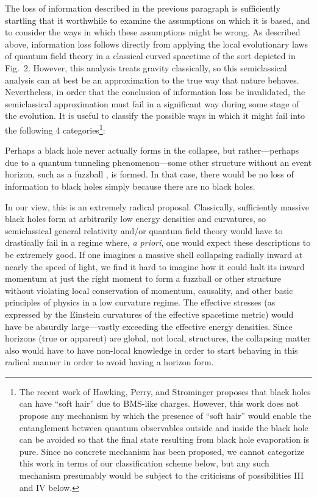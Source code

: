 \documentclass[12pt,nofootinbib,amsmath,amssymb,amsfonts,aps,prd,groupedaddress]{revtex4-1}
\begin{document}
The loss of information described in the previous paragraph is sufficiently
startling that it worthwhile to examine the assumptions on which it is based,
and to consider the ways in which these assumptions might be wrong. As described above, information
loss follows directly from applying the local evolutionary laws of quantum field
theory in a classical curved spacetime of the sort depicted in Fig.~2. However,
this analysis treats gravity classically, so this semiclassical analysis can at
best be an approximation to the true way that nature behaves. Nevertheless, in
order that the conclusion of information loss be invalidated, the semiclassical
approximation must fail in a significant way during some stage of the evolution.
It is useful to classify the possible ways in which it might fail into the following 4
categories\footnote{The recent work of Hawking, Perry, and Strominger \cite{hps} proposes
that black holes can have ``soft hair'' due to BMS-like charges. However, this work does not
propose any mechanism by which the presence of ``soft hair'' would enable the entanglement between quantum observables outside and inside the 
black hole can be avoided so that the final state resulting from black hole evaporation is pure. 
Since no concrete mechanism has been proposed, we cannot categorize this work in terms of our classification scheme below, but any such mechanism presumably would be subject to the criticisms of possibilities III and IV below.}:

\medskip

 Perhaps a
black hole never actually forms in the collapse, but rather---perhaps due to a
quantum tunneling phenomenon---some other structure without an event horizon,
such as a fuzzball \cite{math}, is formed. In that case, there would be no loss of
information to black holes simply because there are no black holes.

In our view, this is an extremely radical proposal. Classically, sufficiently
massive black holes form at arbitrarily low energy densities and curvatures, so
semiclassical general relativity and/or quantum field theory would have to
drastically fail in a regime where, {\it a priori}, one would expect these
descriptions to be extremely good. If one imagines a massive shell collapsing
radially inward at nearly the speed of light, we find it hard to imagine how it
could halt its inward momentum at just the right moment to form a fuzzball or
other structure without violating local conservation of momentum, causality, and
other basic principles of physics in a low curvature regime. The effective stresses
(as expressed by the Einstein curvatures of the effective spacetime metric) would have be absurdly
large---vastly exceeding the effective energy densities. Since horizons (true or apparent)
are global, not local, structures, the collapsing matter also would have to have non-local knowledge in order to start
behaving in this radical manner in order to avoid having a horizon form. 
\end{document}
